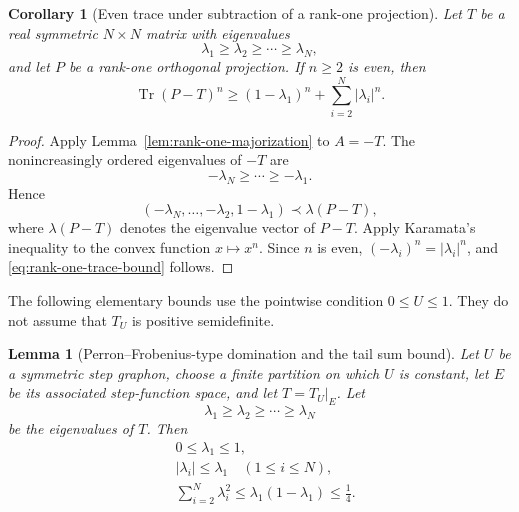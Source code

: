 \documentclass[11pt]{article}
\newtheorem{lemma}[theorem]{Lemma}
\newtheorem{corollary}[theorem]{Corollary}
\theoremstyle{definition}
\theoremstyle{remark}
\newcommand{\tr}{\operatorname{Tr}}
\begin{document}
\begin{corollary}[Even trace under subtraction of a rank-one projection]
  \label{cor:rank-one-trace}
  Let $T$ be a real symmetric $N\times N$ matrix with eigenvalues
  \[
    \lambda_1\ge\lambda_2\ge\cdots\ge\lambda_N,
  \]
  and let $P$ be a rank-one orthogonal projection.  If $n\ge2$ is even, then
  \begin{equation}
    \tr(P-T)^n
    \ge
    (1-\lambda_1)^n+\sum_{i=2}^N|\lambda_i|^n.
    \label{eq:rank-one-trace-bound}
  \end{equation}
\end{corollary}

\begin{proof}
  Apply Lemma~\ref{lem:rank-one-majorization} to $A=-T$.  The nonincreasingly
  ordered eigenvalues of $-T$ are
  \[
    -\lambda_N\ge\cdots\ge-\lambda_1.
  \]
  Hence
  \[
    (-\lambda_N,\ldots,-\lambda_2,1-\lambda_1)
    \prec
    \lambda(P-T),
  \]
  where $\lambda(P-T)$ denotes the eigenvalue vector of $P-T$.  Apply
  Karamata's inequality to the convex function $x\mapsto x^n$.  Since $n$ is
  even, $(-\lambda_i)^n=|\lambda_i|^n$, and
  \eqref{eq:rank-one-trace-bound} follows.
\end{proof}

The following elementary bounds use the pointwise condition $0\le U\le1$.
They do not assume that $T_U$ is positive semidefinite.

\begin{lemma}[Perron--Frobenius-type domination and the tail sum bound]
  \label{lem:spectral-budget}
  Let $U$ be a symmetric step graphon, choose a finite partition on which $U$
  is constant, let $E$ be its associated step-function space, and let
  $T=T_U|_E$.  Let
  \[
    \lambda_1\ge\lambda_2\ge\cdots\ge\lambda_N
  \]
  be the eigenvalues of $T$.  Then
  \begin{align}
    &0\le\lambda_1\le1,
    \label{eq:lambda1-range}\\
    &|\lambda_i|\le\lambda_1
    \quad(1\le i\le N),
    \label{eq:perron-domination}\\
    &\sum_{i=2}^N\lambda_i^2
    \le\lambda_1(1-\lambda_1)
    \le\frac14.
    \label{eq:tail-square-budget}
  \end{align}
\end{lemma}
\end{document}
